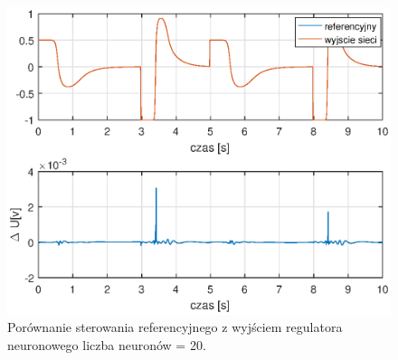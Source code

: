 \begin{figure}[h!]
	\centering
	\includegraphics[scale = 0.8]{fig/20neuronU.eps}
	\caption		
	{Porównanie sterowania referencyjnego z wyjściem regulatora neuronowego liczba neuronów = 20.}
	\label{20nU}
\end{figure}

\FloatBarrier
\newpage